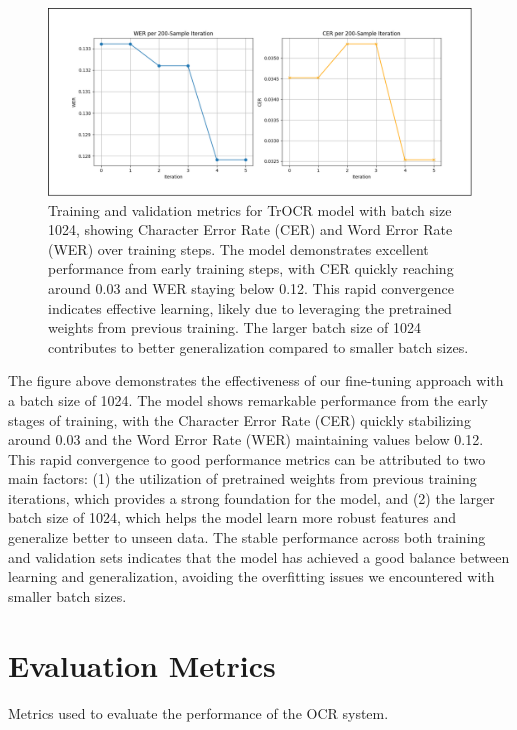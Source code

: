 \begin{figure}[ht]
    \centering
    \includegraphics[width=\textwidth]{figures/trocr_fine_tuning.png}
    \caption{Training and validation metrics for TrOCR model with batch size 1024, 
    showing Character Error Rate (CER) and Word Error Rate (WER) over training steps. 
    The model demonstrates excellent performance from early training steps, with CER quickly 
    reaching around 0.03 and WER staying below 0.12. This rapid convergence indicates effective 
    learning, likely due to leveraging the pretrained weights from previous training. 
    The larger batch size of 1024 contributes to better generalization compared to smaller batch sizes.}
    \label{fig:trocr-fine-tuning}
\end{figure}

The figure above demonstrates the effectiveness of our fine-tuning approach with a batch size of 1024. 
The model shows remarkable performance from the early stages of training, with the Character 
Error Rate (CER) quickly stabilizing around 0.03 and the Word Error Rate (WER) maintaining 
values below 0.12. This rapid convergence to good performance metrics can be attributed to 
two main factors: (1) the utilization of pretrained weights from previous training iterations, 
which provides a strong foundation for the model, and (2) the larger batch size of 1024, which 
helps the model learn more robust features and generalize better to unseen data. The stable 
performance across both training and validation sets indicates that the model has achieved a 
good balance between learning and generalization, avoiding the overfitting issues we 
encountered with smaller batch sizes.


\section{Evaluation Metrics}
\label{sec:metrics}
Metrics used to evaluate the performance of the OCR system.

